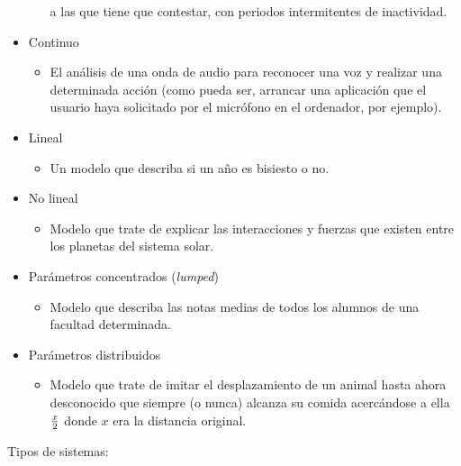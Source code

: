 \documentclass[12pt]{article}
\begin{document}
\begin{itemize}
\begin{itemize}
                  a las que tiene que contestar, con periodos intermitentes de inactividad.
        \end{itemize}
    \item Continuo
        \begin{itemize}
            \item El análisis de una onda de audio para reconocer una voz y realizar una determinada
                  acción (como pueda ser, arrancar una aplicación que el usuario haya solicitado por el
                  micrófono en el ordenador, por ejemplo).
        \end{itemize}
    \item Lineal
        \begin{itemize}
            \item Un modelo que describa si un año es bisiesto o no.
        \end{itemize}
    \item No lineal
        \begin{itemize}
            \item Modelo que trate de explicar las interacciones y fuerzas que existen entre los
                  planetas del sistema solar.
        \end{itemize}
    \item Parámetros concentrados (\emph{lumped})
        \begin{itemize}
            \item Modelo que describa las notas medias de todos los alumnos de una facultad determinada.
        \end{itemize}
    \item Parámetros distribuidos
        \begin{itemize}
            \item Modelo que trate de imitar el desplazamiento de un animal hasta ahora desconocido
                  que siempre (o nunca) alcanza su comida acercándose a ella $x \over 2$ donde $x$ era
                  la distancia original.
        \end{itemize}
\end{itemize}
Tipos de sistemas:
\end{document}
